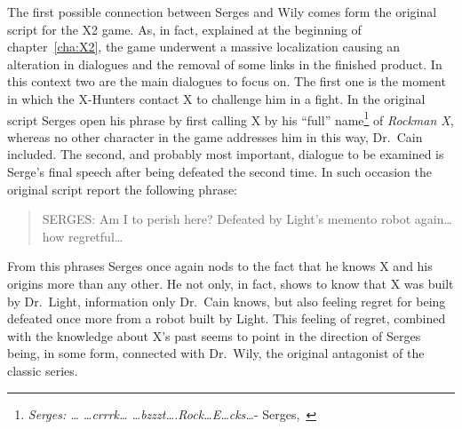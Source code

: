 The first possible connection between Serges and Wily comes form the original script for the X2 game. As, in fact, explained at the beginning of chapter~\ref{cha:X2}, the game underwent a massive localization causing an alteration in dialogues and the removal of some links in the finished product. In this context two are the main dialogues to focus on. The first one is the moment in which the X-Hunters contact X to challenge him in a fight. In the original script Serges open his phrase by first calling X by his ``full'' name\footnote{\textit{Serges: … …crrrk… …bzzzt….Rock…E…cks…}- Serges,~\cite{wordpress:X2_japanese_script}} of \textit{Rockman X}, whereas no other character in the game addresses him in this way, Dr.~Cain included. The second, and probably most important, dialogue to be examined is Serge's final speech after being defeated the second time. In such occasion the original script report the following phrase:
\begin{quote}
	SERGES: Am I to perish here? Defeated by Light’s memento robot again… how regretful…~\cite{wordpress:X2_japanese_script}
\end{quote}
From this phrases Serges once again nods to the fact that he knows X and his origins more than any other. He not only, in fact, shows to know that X was built by Dr.~Light, information only Dr.~Cain knows, but also feeling regret for being defeated once more from a robot built by Light.  This feeling of regret, combined with the knowledge about X's past seems to point in the direction of Serges being, in some form, connected with Dr.~Wily, the original antagonist of the classic series.

